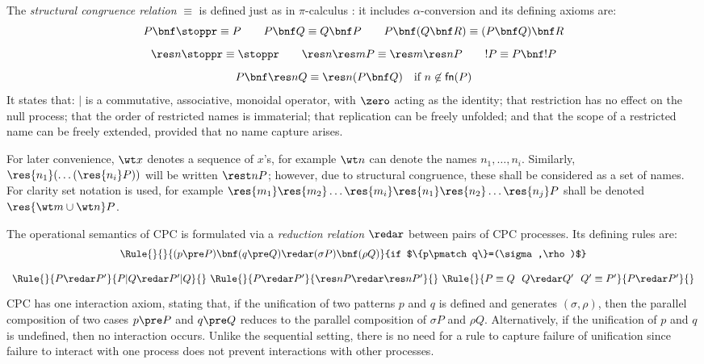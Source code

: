 \documentclass{LMCS}
\renewcommand{\rew}{\redar}
\newcommand{\withsetnot}[2]{#2}
\begin{document}
The {\em structural congruence relation} $\equiv$ is defined
just as in $\pi$-calculus \cite{milner:polyadic-tutorial}: it includes
$\alpha$-conversion and its defining axioms are:
\begin{equation*}
\begin{array}{c}
\vspace*{.3cm}
P\bnf \stoppr \equiv P
\qquad
P \bnf Q \equiv Q \bnf P
\qquad
P \bnf (Q \bnf R) \equiv (P \bnf Q) \bnf R
\\
\vspace*{.3cm}
\res n \stoppr \equiv \stoppr
\qquad
\res n \res m P \equiv \res m \res n P
\qquad
!P \equiv P\bnf !P
\\
P\bnf\res n Q \equiv \res n (P\bnf Q)
\quad \mbox{if $n \not\in{\sf fn}(P)$}
\end{array}
\end{equation*}
It states that: $|$ is a commutative, associative, monoidal operator,
with $\zero$ acting as the identity; that restriction has no effect
on the null process; that the order of restricted names is
immaterial; that replication can be freely unfolded; and that the
scope of a restricted name can be freely extended, provided that no
name capture arises.

For later convenience, $\wt x$ denotes a sequence of $x$'s, for example
$\wt n$ can denote the names $n_1,\ldots,n_i$.
Similarly, $\res {n_1} (\ldots (\res {n_i} P))$ will be written $\rest n P$;
however, due to structural congruence, these shall be considered as a set of names.
\withsetnot{}{For clarity set notation is used, for example
$\res {m_1} \res {m_2}\ldots \res {m_i} \res {n_1} \res {n_2} \ldots \res {n_j} P$
shall be denoted $\res {\wt m \cup \wt n} P$.}

The operational semantics of CPC is formulated via a {\em reduction
relation} $\redar$ between pairs of CPC processes.  Its defining
rules are:
\begin{eqnarray*}
\begin{array}{c}
\Rule{}
{}
{(p\pre P)\bnf(q\pre Q) \redar (\sigma P)\bnf(\rho Q)}{if $\{p\pmatch q\}=(\sigma,\rho)$}\\
\vspace*{.0cm}
\\
\Rule{}
{P \rew P'}{P|Q \rew P'|Q}{}
\ 
\Rule{}
{P \rew P'}{\res n P \rew \res n P'}{}
\ 
\Rule{}
{P \equiv Q \ \ Q \rew Q'\ \ Q' \equiv P'}{P \rew P'}{}
\vspace*{.1cm}
\end{array}
\end{eqnarray*}
CPC has one interaction axiom, stating that, if the unification of two
patterns $p$ and $q$ is defined and generates $(\sigma, \rho)$, then
the parallel composition of two cases $p\pre P$ and $q\pre Q$ reduces
to the parallel composition of $\sigma P$ and $\rho Q$.
Alternatively, if the unification of $p$ and $q$ is undefined, then no
interaction occurs.
Unlike the sequential setting, there is no need for a rule to capture failure
of unification since failure to interact with one process does not
prevent interactions with other processes.
\end{document}
